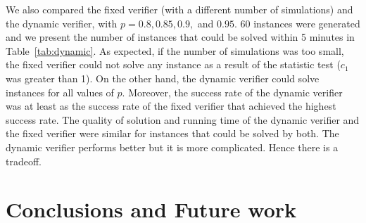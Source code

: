 \documentclass[letterpaper]{article} %
\newcommand{\prcbs}{$p$R-CBS\xspace}
\begin{document}
\begin{table}[t]
\centering
{}
\caption{Success rate for \prcbs{} out of 60 instances.}
\label{tab:dynamic}
\end{table}

We also compared the fixed verifier (with a different number of simulations) and the dynamic verifier, with $p=0.8,0.85,0.9,$ and $0.95$. 60 instances were generated and we present the number of instances that could be solved within 5 minutes in Table~\ref{tab:dynamic}. As expected, if the number of simulations was too small, the fixed verifier could not solve any instance as a result of the statistic test ($c_1$ was greater than 1). On the other hand, the dynamic verifier could solve instances for all values of $p$. Moreover, the success rate of the dynamic verifier was at least as the success rate of the fixed verifier that achieved the highest success rate. The quality of solution and running time of the dynamic verifier and the fixed verifier were similar for instances that could be solved by both. The dynamic verifier performs better but it is more complicated. Hence there is a tradeoff.



\section{Conclusions and Future work}
\end{document}
